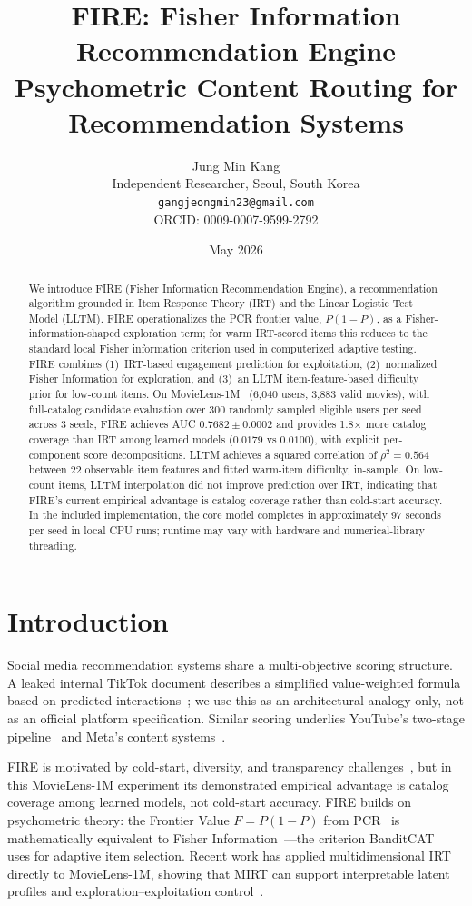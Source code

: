 \documentclass[11pt,a4paper]{article}
\title{FIRE: Fisher Information Recommendation Engine\\[4pt]
\large Psychometric Content Routing for Recommendation Systems}
\author{Jung Min Kang\\
Independent Researcher, Seoul, South Korea\\
\texttt{gangjeongmin23@gmail.com}\\
ORCID: 0009-0007-9599-2792}
\date{May 2026}
\begin{document}
\maketitle

\begin{abstract}
We introduce FIRE (Fisher Information Recommendation Engine), a recommendation algorithm grounded in Item Response Theory (IRT) and the Linear Logistic Test Model (LLTM). FIRE operationalizes the PCR frontier value, $P(1-P)$, as a Fisher-information-shaped exploration term; for warm IRT-scored items this reduces to the standard local Fisher information criterion used in computerized adaptive testing. FIRE combines (1)~IRT-based engagement prediction for exploitation, (2)~normalized Fisher Information for exploration, and (3)~an LLTM item-feature-based difficulty prior for low-count items. On MovieLens-1M~\citep{harper2015movielens} (6,040 users, 3,883 valid movies), with full-catalog candidate evaluation over 300 randomly sampled eligible users per seed across 3 seeds, FIRE achieves AUC $0.7682 \pm 0.0002$ and provides 1.8$\times$ more catalog coverage than IRT among learned models ($0.0179$ vs $0.0100$), with explicit per-component score decompositions. LLTM achieves a squared correlation of $\rho^2 = 0.564$ between 22 observable item features and fitted warm-item difficulty, in-sample. On low-count items, LLTM interpolation did not improve prediction over IRT, indicating that FIRE's current empirical advantage is catalog coverage rather than cold-start accuracy. In the included implementation, the core model completes in approximately 97 seconds per seed in local CPU runs; runtime may vary with hardware and numerical-library threading.
\end{abstract}

\section{Introduction}

Social media recommendation systems share a multi-objective scoring structure. A leaked internal TikTok document describes a simplified value-weighted formula based on predicted interactions~\citep{tiktok_algo}; we use this as an architectural analogy only, not as an official platform specification. Similar scoring underlies YouTube's two-stage pipeline~\citep{covington2016youtube} and Meta's content systems~\citep{meta2023ai}.

FIRE is motivated by cold-start, diversity, and transparency challenges~\citep{kaminskas2016diversity,euaiact}, but in this MovieLens-1M experiment its demonstrated empirical advantage is catalog coverage among learned models, not cold-start accuracy. FIRE builds on psychometric theory: the Frontier Value $F = P(1-P)$ from PCR~\citep{kang2026pcr} is mathematically equivalent to Fisher Information~\citep{lord1968}---the criterion BanditCAT~\citep{sharpnack2024banditcat} uses for adaptive item selection. Recent work has applied multidimensional IRT directly to MovieLens-1M, showing that MIRT can support interpretable latent profiles and exploration--exploitation control~\citep{veldkamp2025mirt}.
\end{document}
